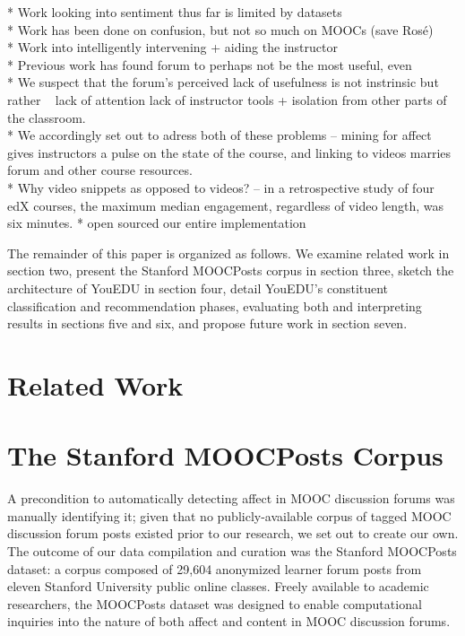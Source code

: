 \documentclass{edm_template}
\begin{document}
* Work looking into sentiment thus far is limited by datasets\\
* Work has been done on confusion, but not so much on MOOCs (save Rosé)\\
* Work into intelligently intervening + aiding the instructor\\
* Previous work has found forum to perhaps not be the most useful, even\\
* We suspect that the forum's perceived lack of usefulness is not instrinsic but rather ~ lack of attention lack of instructor tools + isolation from other parts of the classroom.\\
* We accordingly set out to adress both of these problems -- mining for affect gives instructors a pulse on the state of the course, and linking to videos marries forum and other course resources.\\
* Why video snippets as opposed to videos? \cite{Guo:2014:VPA:2556325.2566239} -- in a retrospective study of four edX courses, the maximum median engagement, regardless of video length, was six minutes.
* open sourced our entire implementation

The remainder of this paper is organized as follows. We examine related work in section two, present the Stanford MOOCPosts corpus in section three, sketch the architecture of YouEDU in section four, detail YouEDU's constituent classification and recommendation phases, evaluating both and interpreting results in sections five and six, and propose future work in section seven.

\section{Related Work}

\section{The Stanford MOOCPosts Corpus}
A precondition to automatically detecting affect in MOOC discussion forums was manually identifying it; given that no publicly-available corpus of tagged MOOC discussion forum posts existed prior to our research, we set out to create our own. The outcome of our data compilation and curation was the Stanford MOOCPosts dataset: a corpus composed of 29,604 anonymized learner forum posts from eleven Stanford University public online classes. Freely available to academic researchers, the MOOCPosts dataset was designed to enable computational inquiries into the nature of both affect and content in MOOC discussion forums.
\end{document}
